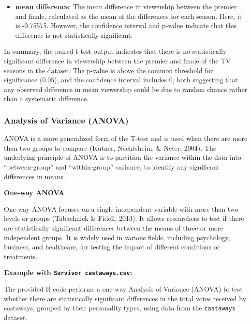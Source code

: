 \documentclass[
]{book}
\providecommand{\tightlist}{%
  \setlength{\itemsep}{0pt}\setlength{\parskip}{0pt}}
\begin{document}
\begin{enumerate}
  \begin{itemize}
  \tightlist
  \item
    \textbf{mean difference}: The mean difference in viewership between the premier and finale, calculated as the mean of the differences for each season. Here, it is -0.75575. However, the confidence interval and p-value indicate that this difference is not statistically significant.
  \end{itemize}
\end{enumerate}

In summary, the paired t-test output indicates that there is no statistically significant difference in viewership between the premier and finale of the TV seasons in the dataset. The p-value is above the common threshold for significance (0.05), and the confidence interval includes 0, both suggesting that any observed difference in mean viewership could be due to random chance rather than a systematic difference.

\hypertarget{analysis-of-variance-anova}{%
\subsubsection*{Analysis of Variance (ANOVA)}\label{analysis-of-variance-anova}}

ANOVA is a more generalized form of the T-test and is used when there are more than two groups to compare (Kutner, Nachtsheim, \& Neter, 2004). The underlying principle of ANOVA is to partition the variance within the data into ``between-group'' and ``within-group'' variance, to identify any significant differences in means.

\textbf{One-way ANOVA}

One-way ANOVA focuses on a single independent variable with more than two levels or groups (Tabachnick \& Fidell, 2013). It allows researchers to test if there are statistically significant differences between the means of three or more independent groups. It is widely used in various fields, including psychology, business, and healthcare, for testing the impact of different conditions or treatments.

\textbf{Example with \texttt{Survivor\ castaways.csv}:}

The provided R code performs a one-way Analysis of Variance (ANOVA) to test whether there are statistically significant differences in the total votes received by castaways, grouped by their personality types, using data from the \texttt{castaways} dataset.
\end{document}

